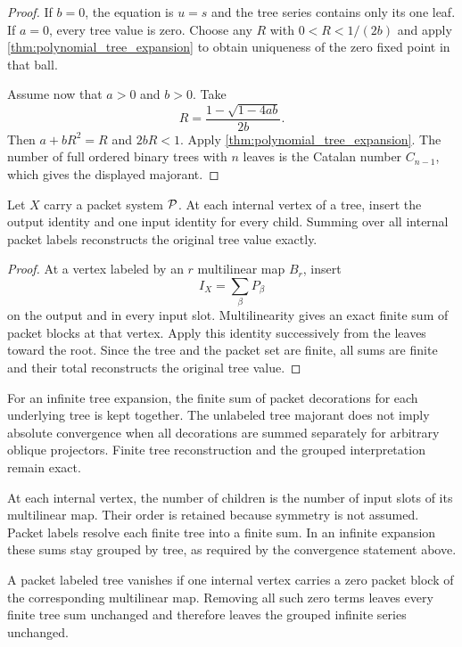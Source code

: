 \begin{proof}
If $b=0$, the equation is $u=s$ and the tree series contains only its one leaf.  If $a=0$, every tree value is zero.  Choose any $R$ with $0<R<1/(2b)$ and apply \cref{thm:polynomial_tree_expansion} to obtain uniqueness of the zero fixed point in that ball.

Assume now that $a>0$ and $b>0$.  Take
\[
R=
\frac{1-\sqrt{1-4ab}}{2b}.
\]
Then $a+bR^2=R$ and $2bR<1$.  Apply \cref{thm:polynomial_tree_expansion}.  The number of full ordered binary trees with $n$ leaves is the Catalan number $C_{n-1}$, which gives the displayed majorant.
\end{proof}

\begin{theorem}\label{thm:packet_tree_reconstruction}
Let $X$ carry a packet system $\mathcal P$.  At each internal vertex of a tree, insert the output identity and one input identity for every child.  Summing over all internal packet labels reconstructs the original tree value exactly.
\end{theorem}

\begin{proof}
At a vertex labeled by an $r$ multilinear map $B_r$, insert
\[
I_X=\sum_\beta P_\beta
\]
on the output and in every input slot.  Multilinearity gives an exact finite sum of packet blocks at that vertex.  Apply this identity successively from the leaves toward the root.  Since the tree and the packet set are finite, all sums are finite and their total reconstructs the original tree value.
\end{proof}

For an infinite tree expansion, the finite sum of packet decorations for each underlying tree is kept together. The unlabeled tree majorant does not imply absolute convergence when all decorations are summed separately for arbitrary oblique projectors. Finite tree reconstruction and the grouped interpretation remain exact.

\begin{interpretation}[title={Arity in a tree}]
At each internal vertex, the number of children is the number of input slots of its multilinear map. Their order is retained because symmetry is not assumed. Packet labels resolve each finite tree into a finite sum. In an infinite expansion these sums stay grouped by tree, as required by the convergence statement above.
\end{interpretation}

\begin{corollary}\label{cor:tree_pruning}
A packet labeled tree vanishes if one internal vertex carries a zero packet block of the corresponding multilinear map.  Removing all such zero terms leaves every finite tree sum unchanged and therefore leaves the grouped infinite series unchanged.
\end{corollary}

